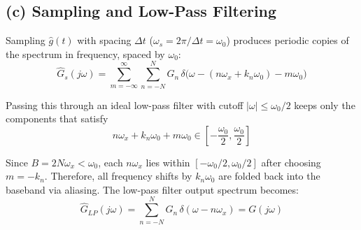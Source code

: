 \documentclass{article}
\begin{document}
\subsection*{(c) Sampling and Low-Pass Filtering}
Sampling \(\hat{g}(t)\) with spacing \(\Delta t\) (\(\omega_s = 2\pi/\Delta t = \omega_0\)) produces periodic copies of the spectrum in frequency, spaced by \(\omega_0\):
\[
\hat{G}_s(j\omega) = \sum_{m=-\infty}^{\infty} \sum_{n=-N}^{N} G_n \, \delta\big(\omega - (n \omega_x + k_n \omega_0) - m \omega_0 \big)
\]

Passing this through an ideal low-pass filter with cutoff \(|\omega| \le \omega_0/2\) keeps only the components that satisfy
\[
n \omega_x + k_n \omega_0 + m \omega_0 \in \left[-\frac{\omega_0}{2}, \frac{\omega_0}{2}\right]
\]

Since \(B = 2 N \omega_x < \omega_0\), each \(n \omega_x\) lies within \([-\omega_0/2, \omega_0/2]\) after choosing \(m = -k_n\). Therefore, all frequency shifts by \(k_n \omega_0\) are folded back into the baseband via aliasing. The low-pass filter output spectrum becomes:
\[
\hat{G}_{LP}(j\omega) = \sum_{n=-N}^{N} G_n \, \delta(\omega - n \omega_x) = G(j\omega)
\]
\end{document}
